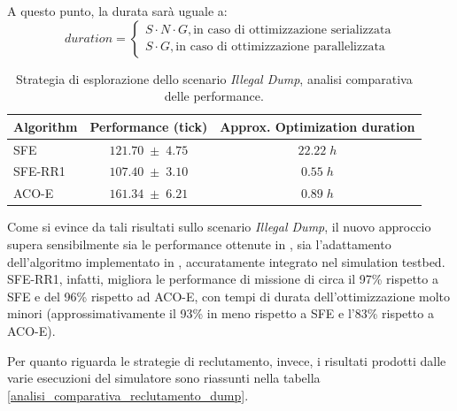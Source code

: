 A questo punto, la durata sarà uguale a:
\begin{equation}
    duration = \begin{cases}
        S \cdot N \cdot G , \text{in caso di ottimizzazione serializzata}\\
        S  \cdot G , \text{in caso di ottimizzazione parallelizzata}
    \end{cases}   
\end{equation}

\begin{table}[H]
    \centering
    \captionsetup{justification=centering, margin=2cm, font=footnotesize}
    \begin{tabular}{|l|c|c|}
    \hline
    \textbf{Algorithm}              & \textbf{Performance (tick)}       & \textbf{Approx. Optimization duration}      \\ \hline
    SFE                             & $121.70 \; \pm \; 4.75$           & $22.22 \; h$                                      \\ \hline
    SFE-RR1                         & $107.40 \; \pm \; 3.10$           & $0.55 \; h$                                       \\ \hline
    ACO-E                           & $161.34 \; \pm \; 6.21$           & $0.89 \; h$                                     \\ \hline
    \end{tabular}%
    
    \caption{Strategia di esplorazione dello scenario \textit{Illegal Dump}, analisi comparativa delle performance.}
    \label{analisi_comparativa_esplorazione_dump}
\end{table}

Come si evince da tali risultati sullo scenario \textit{Illegal Dump}, il nuovo approccio supera sensibilmente sia le performance ottenute in \cite{cimino2019adaptive}, sia l'adattamento dell'algoritmo implementato in \cite{palmieri2017comparison}, accuratamente integrato nel simulation testbed.
SFE-RR1, infatti, migliora le performance di missione di circa il 97\% rispetto a SFE e del 96\% rispetto ad ACO-E, con tempi di durata dell'ottimizzazione molto minori (approssimativamente il 93\% in meno rispetto a SFE e l'83\% rispetto a ACO-E).

Per quanto riguarda le strategie di reclutamento, invece, i risultati prodotti dalle varie esecuzioni del simulatore sono riassunti nella tabella \ref{analisi_comparativa_reclutamento_dump}.

